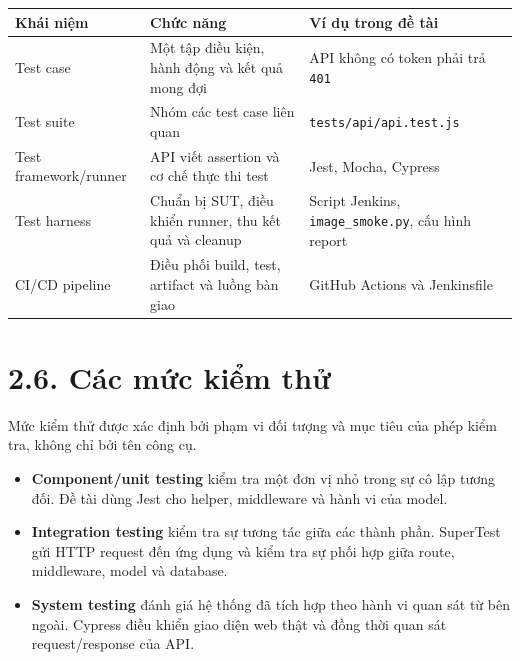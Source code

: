 \documentclass[
  vietnamese,
  12pt,
  a4paper,
  oneside]{report}
\providecommand{\tightlist}{%
  \setlength{\itemsep}{0pt}\setlength{\parskip}{0pt}}
\begin{document}
\begin{longtable}[]{@{}
  >{\raggedright\arraybackslash}p{}
  >{\raggedright\arraybackslash}p{}
  >{\raggedright\arraybackslash}p{}@{}}
\toprule\noalign{}
\begin{minipage}[b]{\linewidth}\raggedright
Khái niệm
\end{minipage} & \begin{minipage}[b]{\linewidth}\raggedright
Chức năng
\end{minipage} & \begin{minipage}[b]{\linewidth}\raggedright
Ví dụ trong đề tài
\end{minipage} \\
\midrule\noalign{}
\endhead
\bottomrule\noalign{}
\endlastfoot
Test case & Một tập điều kiện, hành động và kết quả mong đợi & API không
có token phải trả \texttt{401} \\
Test suite & Nhóm các test case liên quan &
\texttt{tests/api/api.test.js} \\
Test framework/runner & API viết assertion và cơ chế thực thi test &
Jest, Mocha, Cypress \\
Test harness & Chuẩn bị SUT, điều khiển runner, thu kết quả và cleanup &
Script Jenkins, \texttt{image\_smoke.py}, cấu hình report \\
CI/CD pipeline & Điều phối build, test, artifact và luồng bàn giao &
GitHub Actions và Jenkinsfile \\
\end{longtable}

\section{2.6. Các mức kiểm
thử}\label{26-cuxe1c-mux1ee9c-kiux1ec3m-thux1eed}

Mức kiểm thử được xác định bởi phạm vi đối tượng và mục tiêu của phép
kiểm tra, không chỉ bởi tên công cụ.

\begin{itemize}
\tightlist
\item
  \textbf{Component/unit testing} kiểm tra một đơn vị nhỏ trong sự cô
  lập tương đối. Đề tài dùng Jest cho helper, middleware và hành vi của
  model.
\item
  \textbf{Integration testing} kiểm tra sự tương tác giữa các thành
  phần. SuperTest gửi HTTP request đến ứng dụng và kiểm tra sự phối hợp
  giữa route, middleware, model và database.
\item
  \textbf{System testing} đánh giá hệ thống đã tích hợp theo hành vi
  quan sát từ bên ngoài. Cypress điều khiển giao diện web thật và đồng
  thời quan sát request/response của API.
\end{itemize}
\end{document}
